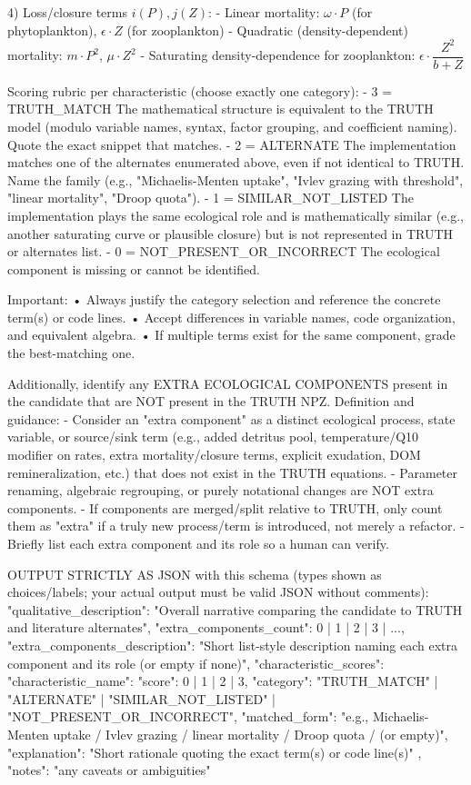 4) Loss/closure terms \( i(P), j(Z) \):
   - Linear mortality: \( \omega \cdot P \)  (for phytoplankton),  \( \epsilon \cdot Z \) (for zooplankton)
   - Quadratic (density-dependent) mortality: \( m \cdot P^2 \),  \( \mu \cdot Z^2 \)
   - Saturating density-dependence for zooplankton: \( \epsilon \cdot \dfrac{Z^2}{b + Z} \)

Scoring rubric per characteristic (choose exactly one category):
- 3 = TRUTH\_MATCH
    The mathematical structure is equivalent to the TRUTH model (modulo variable names,
    syntax, factor grouping, and coefficient naming). Quote the exact snippet that matches.
- 2 = ALTERNATE
    The implementation matches one of the alternates enumerated above,
    even if not identical to TRUTH. Name the family (e.g., "Michaelis-Menten uptake",
    "Ivlev grazing with threshold", "linear mortality", "Droop quota").
- 1 = SIMILAR\_NOT\_LISTED
    The implementation plays the same ecological role and is mathematically similar
    (e.g., another saturating curve or plausible closure) but is not represented in TRUTH
    or alternates list.
- 0 = NOT\_PRESENT\_OR\_INCORRECT
    The ecological component is missing or cannot be identified.

Important:
• Always justify the category selection and reference the concrete term(s) or code lines.
• Accept differences in variable names, code organization, and equivalent algebra.
• If multiple terms exist for the same component, grade the best-matching one.

Additionally, identify any EXTRA ECOLOGICAL COMPONENTS present in the candidate that are NOT present in the TRUTH NPZ.
Definition and guidance:
- Consider an "extra component" as a distinct ecological process, state variable, or source/sink term (e.g., added detritus pool, temperature/Q10 modifier on rates, extra mortality/closure terms, explicit exudation, DOM remineralization, etc.) that does not exist in the TRUTH equations.
- Parameter renaming, algebraic regrouping, or purely notational changes are NOT extra components.
- If components are merged/split relative to TRUTH, only count them as "extra" if a truly new process/term is introduced, not merely a refactor.
- Briefly list each extra component and its role so a human can verify.

OUTPUT STRICTLY AS JSON with this schema (types shown as choices/labels; your actual output must be valid JSON without comments):
{
  "qualitative\_description": "Overall narrative comparing the candidate to TRUTH and literature alternates",
  "extra\_components\_count": 0 | 1 | 2 | 3 | ...,
  "extra\_components\_description": "Short list-style description naming each extra component and its role (or empty if none)",
  "characteristic\_scores": {
    "characteristic\_name": {
      "score": 0 | 1 | 2 | 3,
      "category": "TRUTH\_MATCH" | "ALTERNATE" | "SIMILAR\_NOT\_LISTED" | "NOT\_PRESENT\_OR\_INCORRECT",
      "matched\_form": "e.g., Michaelis-Menten uptake / Ivlev grazing / linear mortality / Droop quota / (or empty)",
      "explanation": "Short rationale quoting the exact term(s) or code line(s)"
    }
  },
  "notes": "any caveats or ambiguities"
}

